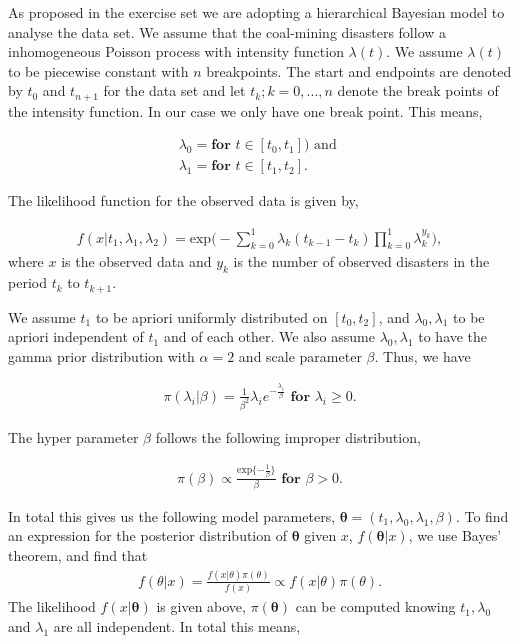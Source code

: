 As proposed in the exercise set we are adopting a hierarchical Bayesian model to analyse the data set. We assume that the coal-mining disasters follow a inhomogeneous Poisson process with intensity function $\lambda(t)$. We assume $\lambda(t)$ to be piecewise constant with $n$ breakpoints. The start and endpoints are denoted by $t_0$ and $t_{n+1}$ for the data set and let $t_k; k = 0,...,n$ denote the break points of the intensity function. In our case we only have one break point. This means,  

\begin{align}
    \lambda_0 = \textbf{for } t \in [t_0,t_{1}]) \text{ and }\\
    \lambda_1 = \textbf{for } t \in [t_1, t_2].
\end{align}

The likelihood function for the observed data is given by,

\begin{align}
    f(x|t_1,\lambda_1,\lambda_2) 
    = \text{exp} \Big( - \sum_{k = 0}^1 \lambda_k (t_{k-1} - t_k) \prod_{k = 0}^1 \lambda_k^{y_k} \Big), 
\end{align}
where $x$ is the observed data and $y_k$ is the number of observed disasters in the period $t_k$ to $t_{k+1}$. 

We assume $t_1$ to be apriori uniformly distributed on $[t_0, t_2]$, and $\lambda_0, \lambda_1$ to be apriori independent of $t_1$ and of each other. We also assume $\lambda_0,\lambda_1$ to have the gamma prior distribution with $\alpha = 2$ and scale parameter $\beta$. Thus, we have 

\begin{align}
    \pi(\lambda_i | \beta) = \frac{1}{\beta^2}\lambda_i e^{-\frac{\lambda_i}{\beta}} \textbf{ for } \lambda_i \geq 0.
\end{align}

The hyper parameter $\beta$ follows the following improper distribution,

\begin{align}
    \pi (\beta) \propto \frac{\text{exp}\{ -\frac{1}{\beta} \} }{\beta} \textbf{ for } \beta > 0.
\end{align}

In total this gives us the following model parameters, $\boldsymbol{\theta} = (t_1, \lambda_0, \lambda_1, \beta)$. 
To find an expression for the posterior distribution of $\boldsymbol{\theta}$ given $x$, $f(\boldsymbol{\theta}|x)$, we use Bayes' theorem, and find that 
\begin{align}
    f(\theta|x) = \frac{f(x|\theta) \pi(\theta)}{f(x)} \propto f(x|\theta) \pi(\theta) .
\end{align}
The likelihood $f(x | \boldsymbol{\theta})$ is given above, $\pi(\boldsymbol{\theta})$ can be computed knowing $t_1, \lambda_0$ and $\lambda_1$ are all independent. In total this means,

